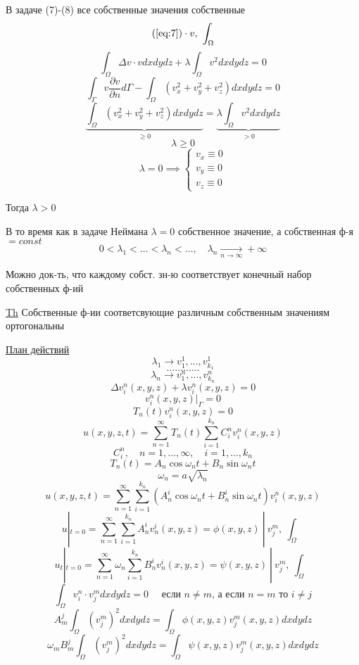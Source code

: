\documentclass[a4paper]{article}
\begin{document}
В задаче (7)-(8) все собственные значения собственные
\[
    (\ref{eq:7}) \cdot v, \ \int_{\Omega}
\]
\[
    \int_{\Omega} \Delta v \cdot v dx dy dz + \lambda \int_{\Omega} v^2 dxdydz
    = 0
\]
\[
    \int_{\Gamma} v \frac{\partial v}{\partial n} d\Gamma - 
    \int_{\Omega}(v_x^2 + v_y^2 + v_z^2) dxdydz = 0
\]
\[
    \underbrace{\int_{\Omega}(v_x^2 + v_y^2 + v_z^2) dxdydz}_{\geq 0} =
    \underbrace{\lambda \int_{\Omega}v^2 dxdydz}_{> 0}
\]
\[
    \lambda \geq 0
\]
\[
    \lambda = 0 \implies \begin{cases}
        v_x \equiv 0\\
        v_y \equiv 0\\
        v_z \equiv 0
    \end{cases}
\]

Тогда $ \lambda > 0 $ 

В то время как в задаче Неймана $ \lambda = 0 $ собственное значение, а собственная ф-я $ = const $ 
\[
    0 < \lambda_1 < \dots < \lambda_n < \dots, \quad \lambda_n \xrightarrow[n \to \infty]{}
    +\infty
\]

\begin{tcolorbox}
    Можно док-ть, что каждому собст. зн-ю соответствует конечный набор собственных ф-ий
\end{tcolorbox}

\begin{tcolorbox}
    \underline{Th} Собственные ф-ии соответсвующие различным собственным значениям
    ортогональны

    \underline{План действий}
    \[
        \lambda_1 \to v_1^{1}, \dots, v_{k_1}^{1}
    \]
    \[
        \dots\dots\dots\dots
    \]
    \[
        \lambda_n \to v_1^{n}, \dots, v_{k_n}^{n}
    \]
    \[
        \Delta v_i^{n}(x,y,z) + \lambda v_i^{n}(x,y,z) = 0
    \]
    \[
        v_i^{n}(x,y,z) |_{\Gamma} = 0
    \]
    \[
        T_n(t) v_i^n(x,y,z) = 0
    \]
    \[
        u(x,y,z,t) = \sum_{n=1}^{\infty} T_n(t)
        \sum_{i=1}^{k_n} C_i^n v_i^n(x,y,z)
    \]
    \[
        C_i^n,\quad n = 1, \dots , \infty, \quad i = 1, \dots, k_n
    \]
    \[
        T_n(t) = A_n \cos \omega_n t + B_n \sin \omega_n t
    \]
    \[
        \omega_n = a \sqrt{\lambda_n} 
    \]
    \[
        u(x,y,z,t) = \sum_{n=1}^{\infty} \sum_{i=1}^{k_n} \left( 
        A_n^i \cos \omega_n t + B_n^{i} \sin \omega_n t \right) v_i^n(x,y,z)
    \]
    \[
        u |_{t=0} = \sum_{n=1}^{\infty} \sum_{i=1}^{k_n} A_n^i v_n^i(x,y,z) 
        = \phi(x,y,z) \ | \ v_j^m, \ \int_{\Omega}
    \]
    \[
        u_t |_{t=0} = \sum_{n=1}^{\infty}\omega_n \sum_{i=1}^{k_n} B_n^i v_n^i(x,y,z) 
        = \psi(x,y,z)\ | \ v_j^m, \ \int_{\Omega}
    \]
    \[
        \int_{\Omega} v_i^n \cdot v_j^m dxdydz = 0 \quad \text{ если } n \neq m
        \text{, а если } n = m \text{ то } i \neq j
    \]
    \[
        A_m^j \int_{\Omega} (v_j^m)^2 dxdydz = \int_{\Omega}\phi(x,y,z)
        v_{j}^{m}(x,y,z) dxdydz
    \]
    \[
        \omega_m B_m^j \int_{\Omega} (v_j^m)^2 dxdydz = \int_{\Omega}\psi(x,y,z)
        v_{j}^{m}(x,y,z) dxdydz
    \]
\end{tcolorbox}
\end{document}
